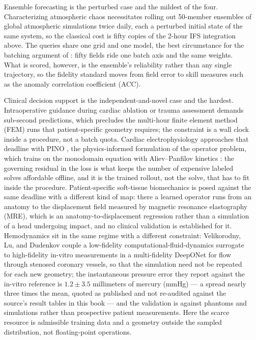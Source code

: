 Ensemble forecasting is the perturbed case and the mildest of the four. Characterizing atmospheric chaos
necessitates rolling out 50-member ensembles of global
atmospheric simulations twice daily, each a perturbed initial state of the same system, so the
classical cost is fifty copies of the 2-hour IFS integration above. The queries share one grid and one
model, the best circumstance for the batching argument of
: fifty fields ride one batch axis
and the same weights. What is scored, however, is the ensemble's reliability
rather than any single trajectory, so the
fidelity standard moves from field error to skill measures such as the anomaly correlation
coefficient (ACC).

Clinical decision support is the independent-and-novel case and the hardest. Intraoperative guidance
during cardiac ablation or trauma assessment demands sub-second
predictions, which precludes the multi-hour finite element method (FEM) runs that
patient-specific geometry requires; the constraint is a wall clock inside a procedure, not a batch
quota.
Cardiac electrophysiology approaches that deadline with PINO \cite{li2021physics}, the physics-informed
formulation of the operator problem, which
 trains on the monodomain equation with
Aliev--Panfilov kinetics \cite{aliev1996simple}: the governing residual in the loss is what keeps the
number of expensive labeled solves affordable offline, and it is the trained rollout, not the solve,
that has to fit inside the procedure.
Patient-specific soft-tissue biomechanics is posed against the same deadline with a different kind of map:
there a learned operator runs from an anatomy to the displacement field measured by magnetic
resonance elastography (MRE), which is an anatomy-to-displacement regression rather than a
simulation of a head undergoing impact, and no clinical validation is established for
it.
Hemodynamics sit in the same regime with a different constraint: Velikorodny, Lu, and Dudenkov
\cite{deeponetblood2025} couple a low-fidelity computational-fluid-dynamics surrogate to
high-fidelity in-vitro measurements in a multi-fidelity DeepONet for flow through stenosed
coronary vessels, so that the simulation need not be repeated for each new geometry; the
instantaneous pressure error they report against the in-vitro reference is $1.2 \pm 3.5$
millimeters of mercury (mmHg) --- a spread nearly three times the mean, quoted as published
and not re-audited against the source's result tables in this book --- and the validation is against phantoms and simulations rather than
prospective patient measurements. Here the scarce
resource is admissible training data and a geometry outside the sampled distribution, not
floating-point operations.

